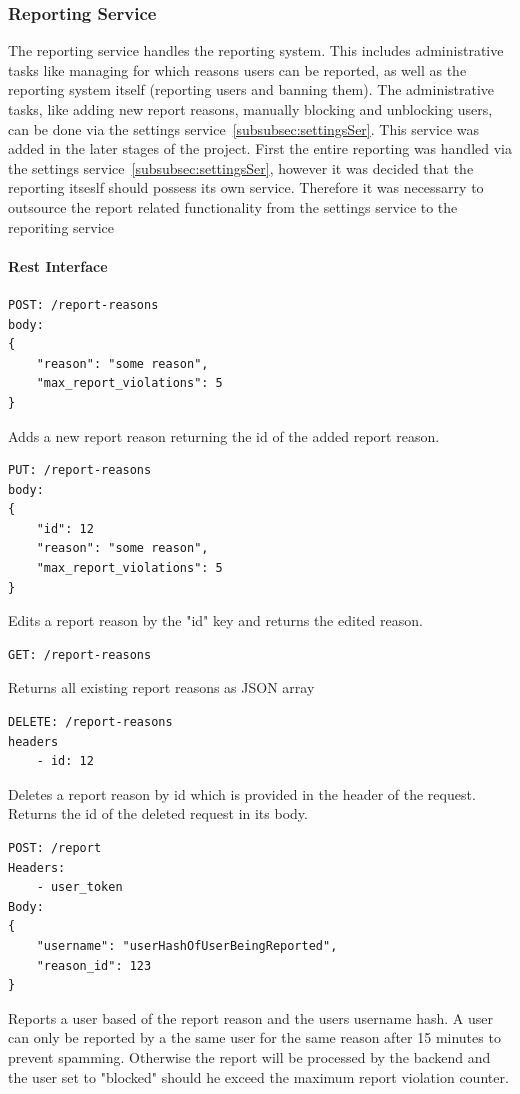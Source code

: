 \subsubsection{Reporting Service}
\label{subsubsec:reportingSer}
The reporting service handles the reporting system.
This includes administrative tasks like managing for which reasons users can be reported, as well as the reporting system itself (reporting users and banning them).
The administrative tasks, like adding new report reasons, manually blocking and unblocking users, can be done via the
settings service~\ref{subsubsec:settingsSer}.
This service was added in the later stages of the project.
First the entire reporting was handled via the settings service~\ref{subsubsec:settingsSer}, however it was decided that the reporting itseslf should possess its own service.
Therefore it was necessarry to outsource the report related functionality from the settings service to the reporiting service

\paragraph{Rest Interface}
\begin{verbatim}
POST: /report-reasons
body:
{
    "reason": "some reason",
    "max_report_violations": 5
}
\end{verbatim}
Adds a new report reason returning the id of the added report reason.

\begin{verbatim}
PUT: /report-reasons
body:
{
    "id": 12
    "reason": "some reason",
    "max_report_violations": 5
}
\end{verbatim}
Edits a report reason by the "id" key and returns the edited reason.

\begin{verbatim}
GET: /report-reasons
\end{verbatim}
Returns all existing report reasons as JSON array

\begin{verbatim}
DELETE: /report-reasons
headers
    - id: 12
\end{verbatim}
Deletes a report reason by id which is provided in the header of the request.
Returns the id of the deleted request in its body.

\begin{verbatim}
POST: /report
Headers:
    - user_token
Body:
{
    "username": "userHashOfUserBeingReported",
    "reason_id": 123
}
\end{verbatim}
Reports a user based of the report reason and the users username hash.
A user can only be reported by a the same user for the same reason after 15 minutes to prevent spamming.
Otherwise the report will be processed by the backend and the user set to "blocked" should he exceed the maximum report violation counter.
